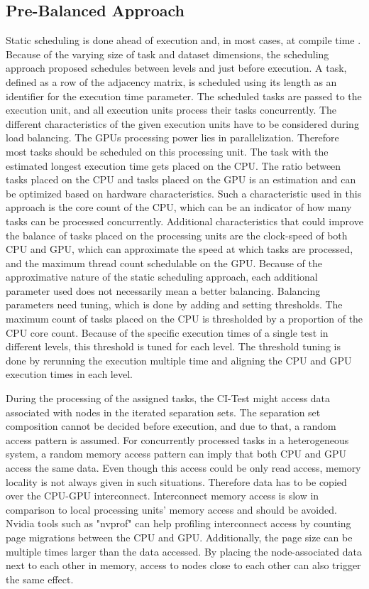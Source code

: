 \subsection{Pre-Balanced Approach}
Static scheduling is done ahead of execution and, in most cases, at compile time \cite{singhSurveyStaticScheduling2015}. Because of the varying size of task and dataset dimensions, the scheduling approach proposed schedules between levels and just before execution. A task, defined as a row of the adjacency matrix, is scheduled using its length as an identifier for the execution time parameter. The scheduled tasks are passed to the execution unit, and all execution units process their tasks concurrently. The different characteristics of the given execution units have to be considered during load balancing. The GPUs processing power lies in parallelization. Therefore most tasks should be scheduled on this processing unit. The task with the estimated longest execution time gets placed on the CPU. The ratio between tasks placed on the CPU and tasks placed on the GPU is an estimation and can be optimized based on hardware characteristics. Such a characteristic used in this approach is the core count of the CPU, which can be an indicator of how many tasks can be processed concurrently. Additional characteristics that could improve the balance of tasks placed on the processing units are the clock-speed of both CPU and GPU, which can approximate the speed at which tasks are processed, and the maximum thread count schedulable on the GPU. Because of the approximative nature of the static scheduling approach, each additional parameter used does not necessarily mean a better balancing. Balancing parameters need tuning, which is done by adding and setting thresholds.
The maximum count of tasks placed on the CPU is thresholded by a proportion of the CPU core count. Because of the specific execution times of a single test in different levels, this threshold is tuned for each level. The threshold tuning is done by rerunning the execution multiple time and aligning the CPU and GPU execution times in each level.

During the processing of the assigned tasks, the CI-Test might access data associated with nodes in the iterated separation sets. The separation set composition cannot be decided before execution, and due to that, a random access pattern is assumed. For concurrently processed tasks in a  heterogeneous system, a random memory access pattern can imply that both CPU and GPU access the same data. Even though this access could be only read access, memory locality is not always given in such situations. Therefore data has to be copied over the CPU-GPU interconnect. Interconnect memory access is slow in comparison to local processing units' memory access and should be avoided. Nvidia tools such as "nvprof" can help profiling interconnect access by counting page migrations between the CPU and GPU. Additionally, the page size can be multiple times larger than the data accessed. By placing the node-associated data next to each other in memory, access to nodes close to each other can also trigger the same effect.

